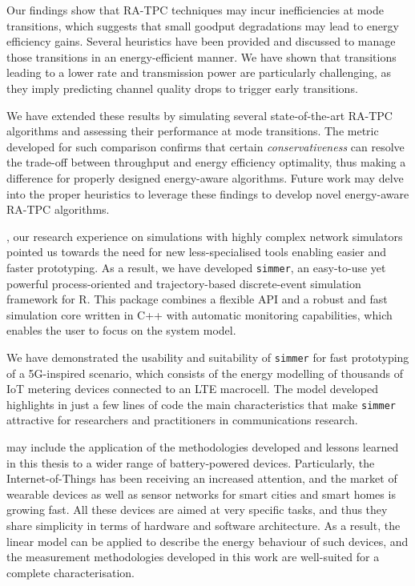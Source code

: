 \documentclass[twoside,nohyper]{tufte-book}
\begin{document}
Our findings\cite[0pt]{contrib-06} show that RA-TPC techniques may incur inefficiencies at mode transitions, which suggests that small goodput degradations may lead to energy efficiency gains. Several heuristics have been provided and discussed to manage those transitions in an energy-efficient manner. We have shown that transitions leading to a lower rate and transmission power are particularly challenging, as they imply predicting channel quality drops to trigger early transitions.

We have extended\cite[0pt]{contrib-07} these results by simulating several state-of-the-art RA-TPC algorithms and assessing their performance at mode transitions. The metric developed for such comparison confirms that certain \emph{conservativeness} can resolve the trade-off between throughput and energy efficiency optimality, thus making a difference for properly designed energy-aware algorithms. Future work may delve into the proper heuristics to leverage these findings to develop novel energy-aware RA-TPC algorithms.

, our research experience on simulations with highly complex network simulators pointed us towards the need for new less-specialised tools enabling easier and faster prototyping. As a result, we have developed \texttt{simmer}\cite[0pt]{contrib-08a}, an easy-to-use yet powerful process-oriented and trajectory-based discrete-event simulation framework for R. This package combines a flexible API and a robust and fast simulation core written in C++ with automatic monitoring capabilities, which enables the user to focus on the system model.

\pagebreak

We have demonstrated\cite[0pt]{contrib-08b} the usability and suitability of \texttt{simmer} for fast prototyping of a 5G-inspired scenario, which consists of the energy modelling of thousands of IoT metering devices connected to an LTE macrocell. The model developed highlights in just a few lines of code the main characteristics that make \texttt{simmer} attractive for researchers and practitioners in communications research.

 may include the application of the methodologies developed and lessons learned in this thesis to a wider range of battery-powered devices. Particularly, the Internet-of-Things has been receiving an increased attention, and the market of wearable devices as well as sensor networks for smart cities and smart homes is growing fast. All these devices are aimed at very specific tasks, and thus they share simplicity in terms of hardware and software architecture. As a result, the linear model can be applied to describe the energy behaviour of such devices, and the measurement methodologies developed in this work are well-suited for a complete characterisation.
\end{document}
